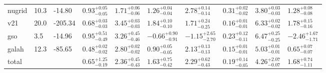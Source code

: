 \documentclass[fleqn,
usenatbib]{mnras}
\begin{document}
\begin{table}
\begin{tabular}{l l l l l l l l l l}
nugrid           &     10.3 &   -14.80 & $0.93^{+0.05}_{-0.05}$  &  $1.71^{+0.06}_{-0.06}$  &  $1.26^{+0.04}_{-0.04}$  &  $2.78^{+0.14}_{-0.14}$  &  $0.31^{+0.02}_{-0.02}$  &  $3.80^{+0.03}_{-0.03}$  &  $1.28^{+0.08}_{-0.08}$\\ 
v21              &     20.0 &  -205.34 & $0.68^{+0.03}_{-0.03}$  &  $3.45^{+0.03}_{-0.03}$  &  $1.84^{+0.10}_{-0.10}$  &  $1.71^{+0.24}_{-0.25}$  &  $0.16^{+0.01}_{-0.01}$  &  $6.33^{+0.02}_{-0.02}$  &  $1.78^{+0.15}_{-0.16}$\\ 
gso              &      3.5 &   -14.96 & $0.95^{+0.51}_{-0.49}$  &  $3.26^{+0.45}_{-0.46}$  &  $-0.66^{+0.90}_{-0.91}$  &  $-1.15^{+2.65}_{-2.70}$  &  $0.23^{+0.12}_{-0.11}$  &  $6.47^{+0.25}_{-0.25}$  &  $-2.46^{+1.67}_{-1.71}$\\ 
galah            &     12.3 &   -85.65 & $0.48^{+0.02}_{-0.02}$  &  $2.80^{+0.02}_{-0.02}$  &  $0.90^{+0.05}_{-0.05}$  &  $2.13^{+0.13}_{-0.13}$  &  $0.15^{+0.01}_{-0.01}$  &  $5.03^{+0.01}_{-0.01}$  &  $0.65^{+0.07}_{-0.07}$\\ 


\hline
total & &   &  $0.65^{+1.25}_{-0.19}$  &  $2.36^{+0.45}_{-0.43}$  &  $1.63^{+0.75}_{-0.42}$  &  $2.29^{+0.62}_{-0.43}$  &  $0.19^{+0.14}_{-0.05}$  &  $4.26^{+2.07}_{-0.07}$  &  $1.68^{+0.74}_{-1.11}$\\
\hline
    \end{tabular}

    
\end{table}
\end{document}

